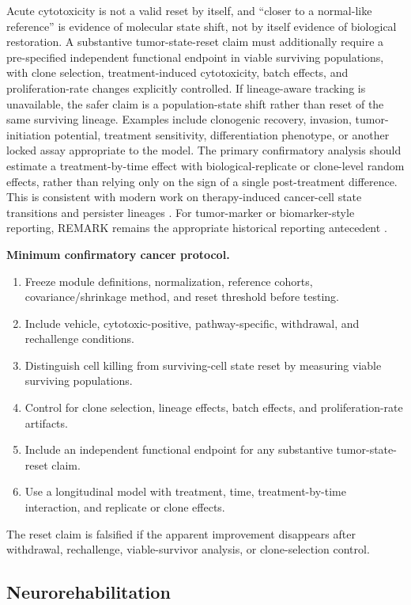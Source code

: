 \documentclass[11pt,a4paper]{article}
\newcommand{\1}{\mathbf{1}}
\begin{document}
Acute cytotoxicity is not a valid reset by itself, and ``closer to a normal-like reference'' is evidence of molecular state shift, not by itself evidence of biological restoration. A substantive tumor-state-reset claim must additionally require a pre-specified independent functional endpoint in viable surviving populations, with clone selection, treatment-induced cytotoxicity, batch effects, and proliferation-rate changes explicitly controlled. If lineage-aware tracking is unavailable, the safer claim is a population-state shift rather than reset of the same surviving lineage. Examples include clonogenic recovery, invasion, tumor-initiation potential, treatment sensitivity, differentiation phenotype, or another locked assay appropriate to the model. The primary confirmatory analysis should estimate a treatment-by-time effect with biological-replicate or clone-level random effects, rather than relying only on the sign of a single post-treatment difference. This is consistent with modern work on therapy-induced cancer-cell state transitions and persister lineages \cite{oren2021}.
For tumor-marker or biomarker-style reporting, REMARK remains the appropriate historical reporting antecedent \cite{remark}.

\noindent\textbf{Minimum confirmatory cancer protocol.}
\begin{enumerate}
  \item Freeze module definitions, normalization, reference cohorts, covariance/shrinkage method, and reset threshold before testing.
  \item Include vehicle, cytotoxic-positive, pathway-specific, withdrawal, and rechallenge conditions.
  \item Distinguish cell killing from surviving-cell state reset by measuring viable surviving populations.
  \item Control for clone selection, lineage effects, batch effects, and proliferation-rate artifacts.
  \item Include an independent functional endpoint for any substantive tumor-state-reset claim.
  \item Use a longitudinal model with treatment, time, treatment-by-time interaction, and replicate or clone effects.
\end{enumerate}

The reset claim is falsified if the apparent improvement disappears after withdrawal, rechallenge, viable-survivor analysis, or clone-selection control.

\subsection{Neurorehabilitation}
\end{document}

